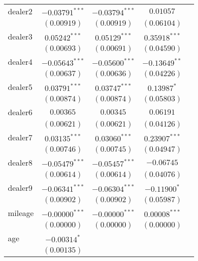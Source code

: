 \begin{table}
\begin{center}
\begin{tabular}{l c c c c}
dealer2          & $-0.03791^{***}$ & $-0.03794^{***}$ & $0.01057$        &                \\
                 & $(0.00919)$      & $(0.00919)$      & $(0.06104)$      &                \\
dealer3          & $0.05242^{***}$  & $0.05129^{***}$  & $0.35918^{***}$  &                \\
                 & $(0.00693)$      & $(0.00691)$      & $(0.04590)$      &                \\
dealer4          & $-0.05643^{***}$ & $-0.05600^{***}$ & $-0.13649^{**}$  &                \\
                 & $(0.00637)$      & $(0.00636)$      & $(0.04226)$      &                \\
dealer5          & $0.03791^{***}$  & $0.03747^{***}$  & $0.13987^{*}$    &                \\
                 & $(0.00874)$      & $(0.00874)$      & $(0.05803)$      &                \\
dealer6          & $0.00365$        & $0.00345$        & $0.06191$        &                \\
                 & $(0.00621)$      & $(0.00621)$      & $(0.04126)$      &                \\
dealer7          & $0.03135^{***}$  & $0.03060^{***}$  & $0.23907^{***}$  &                \\
                 & $(0.00746)$      & $(0.00745)$      & $(0.04947)$      &                \\
dealer8          & $-0.05479^{***}$ & $-0.05457^{***}$ & $-0.06745$       &                \\
                 & $(0.00614)$      & $(0.00614)$      & $(0.04076)$      &                \\
dealer9          & $-0.06341^{***}$ & $-0.06304^{***}$ & $-0.11900^{*}$   &                \\
                 & $(0.00902)$      & $(0.00902)$      & $(0.05987)$      &                \\
mileage          & $-0.00000^{***}$ & $-0.00000^{***}$ & $0.00008^{***}$  &                \\
                 & $(0.00000)$      & $(0.00000)$      & $(0.00000)$      &                \\
age              & $-0.00314^{*}$   &                  &                  &                \\
                 & $(0.00135)$      &                  &                  &                \\

\end{tabular}
\end{center}
\end{table}
